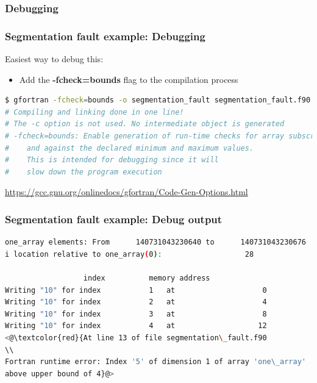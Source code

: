 \documentclass[t]{myBeamer}
\begin{document}
\subsubsection{Debugging} 
\begin{frame}[fragile,t]
\frametitle{ \huge Segmentation fault example: Debugging}
\vspace{-10pt}
  Easiest way to debug this:
  \begin{itemize}
   \item Add the \textbf{-fcheck=bounds} flag to the compilation process
  \end{itemize}
  
\begin{lstlisting}[language=bash]
$ gfortran -fcheck=bounds -o segmentation_fault segmentation_fault.f90
# Compiling and linking done in one line!
# The -c option is not used. No intermediate object is generated
# -fcheck=bounds: Enable generation of run-time checks for array subscripts
#    and against the declared minimum and maximum values.
#    This is intended for debugging since it will
#    slow down the program execution
\end{lstlisting}

\url{https://gcc.gnu.org/onlinedocs/gfortran/Code-Gen-Options.html}
\end{frame} 

\begin{frame}[fragile,t]
\frametitle{ \huge Segmentation fault example: Debug output}
\vspace{-10pt}
\begin{lstlisting}[language=bash]
one_array elements: From      140731043230640 to      140731043230676
i location relative to one_array(0):                   28

			      index          memory address
Writing "10" for index           1   at                    0
Writing "10" for index           2   at                    4
Writing "10" for index           3   at                    8
Writing "10" for index           4   at                   12
<@\textcolor{red}{At line 13 of file segmentation\_fault.f90
\\
Fortran runtime error: Index '5' of dimension 1 of array 'one\_array'
above upper bound of 4}@>
\end{lstlisting}

\end{frame} 
\end{document}
